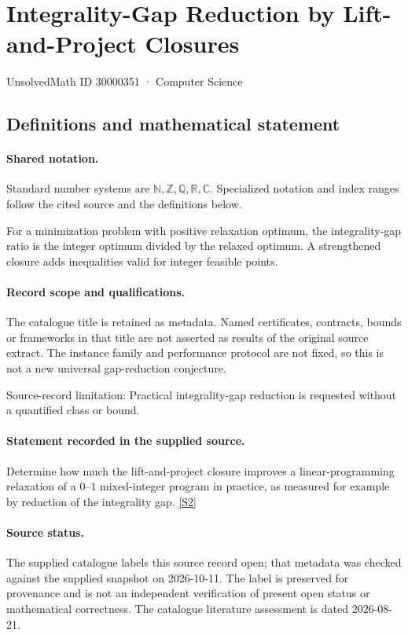\documentclass[11pt]{article}
\newcommand{\sref}[2]{\hyperlink{source:#1:#2}{[S#2]}}
\begin{document}
\setcounter{section}{30000350}
\section{Integrality-Gap Reduction by Lift-and-Project Closures}\label{30000351}
{\small\sffamily UnsolvedMath ID 30000351 · Computer Science}
\subsection{Definitions and mathematical statement}

\paragraph{Shared notation.}Standard number systems are $\mathbb N,\mathbb Z,\mathbb Q,\mathbb R,\mathbb C$. Specialized notation and index ranges follow the cited source and the definitions below.


For a minimization problem with positive relaxation optimum, the integrality-gap ratio is the integer optimum divided by the relaxed optimum. A strengthened closure adds inequalities valid for integer feasible points.
\paragraph{Record scope and qualifications.}
The catalogue title is retained as metadata. Named certificates, contracts, bounds or frameworks in that title are not asserted as results of the original source extract.
The instance family and performance protocol are not fixed, so this is not a new universal gap-reduction conjecture.

Source-record limitation: Practical integrality-gap reduction is requested without a quantified class or bound.
\paragraph{Statement recorded in the supplied source.}
Determine how much the lift-and-project closure improves a linear-programming relaxation of a $0$–$1$ mixed-integer program in practice, as measured for example by reduction of the integrality gap. \sref{30000351}{2}
\paragraph{Source status.}
The supplied catalogue labels this source record open; that metadata was checked against the supplied snapshot on 2026-10-11. The label is preserved for provenance and is not an independent verification of present open status or mathematical correctness. The catalogue literature assessment is dated 2026-08-21.
\end{document}
